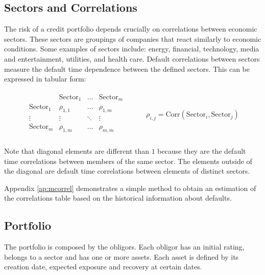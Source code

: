 \documentclass[a4paper,12pt,final]{article}
\begin{document}
\subsection{Sectors and Correlations}
\label{sectors}
The risk of a credit portfolio depends crucially on correlations between 
economic sectors. These sectors are groupings of companies that react similarly to 
economic conditions. Some examples of sectors include: energy, financial, technology, 
media and entertainment, utilities, and health care. Default correlations between 
sectors measure the default time dependence between the defined sectors. This 
can be expressed in tabular form:

\begin{center}
\begin{displaymath}
\begin{array}{cc}
\begin{array}{c|ccc}
                    & \mathrm{Sector}_1 & \dots  & \mathrm{Sector}_{m} \\
\hline
\mathrm{Sector}_1   & \rho_{1,1}        & \dots  & \rho_{1,m} \\
\vdots              & \vdots            & \ddots & \vdots     \\
\mathrm{Sector}_{m} & \rho_{1,m}        & \dots  & \rho_{m,m} \\
\end{array}
&
\qquad \rho_{i,j} = \mathrm{Corr}(\mathrm{Sector}_i, \mathrm{Sector}_j)
\end{array}
\end{displaymath}
\end{center}

Note that diagonal elements are different than $1$ because they are the default time 
correlations between members of the same sector. The elements outside of the
diagonal are default time correlations between elements of distinct sectors.
\newline

Appendix \ref{ap:mcorrel} demonstrates a simple method to obtain an estimation of
the correlations table based on the historical information about defaults.

\subsection{Portfolio}
The portfolio is composed by the obligors. Each obligor has an initial rating, 
belongs to a sector and has one or more assets. Each asset
is defined by its creation date, expected exposure and recovery at certain 
dates.
\end{document}

